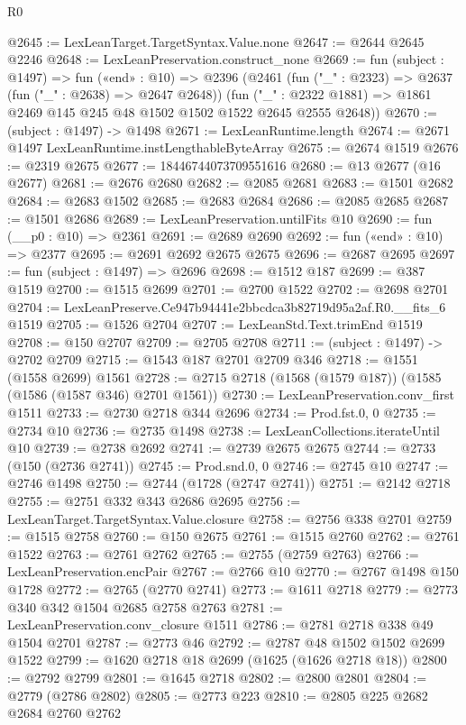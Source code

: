 \begin{lexlean}{R0}
\begin{coremodule}
@2645 := LexLeanTarget.TargetSyntax.Value.none
@2647 := @2644 @2645 @2246
@2648 := LexLeanPreservation.construct_none
@2669 := fun (subject : @1497) =>
  fun («end» : @10) =>
  @2396
    (@2461
      (fun ("_" : @2323) => @2637 (fun ("_" : @2638) => @2647 @2648))
      (fun ("_" : @2322 @1881) => @1861 @2469 @145 @245 @48 @1502 @1502 @1522 @2645 @2555 @2648))
@2670 := (subject : @1497) -> @1498
@2671 := LexLeanRuntime.length
@2674 := @2671 @1497 LexLeanRuntime.instLengthableByteArray
@2675 := @2674 @1519
@2676 := @2319 @2675
@2677 := 18446744073709551616
@2680 := @13 @2677 (@16 @2677)
@2681 := @2676 @2680
@2682 := @2085 @2681
@2683 := @1501 @2682
@2684 := @2683 @1502
@2685 := @2683 @2684
@2686 := @2085 @2685
@2687 := @1501 @2686
@2689 := LexLeanPreservation.untilFits @10
@2690 := fun (__p0 : @10) => @2361
@2691 := @2689 @2690
@2692 := fun («end» : @10) => @2377
@2695 := @2691 @2692 @2675 @2675
@2696 := @2687 @2695
@2697 := fun (subject : @1497) => @2696
@2698 := @1512 @187
@2699 := @387 @1519
@2700 := @1515 @2699
@2701 := @2700 @1522
@2702 := @2698 @2701
@2704 := LexLeanPreserve.Ce947b94441e2bbcdca3b82719d95a2af.R0.__fits_6 @1519
@2705 := @1526 @2704
@2707 := LexLeanStd.Text.trimEnd @1519
@2708 := @150 @2707
@2709 := @2705 @2708
@2711 := (subject : @1497) -> @2702 @2709
@2715 := @1543 @187 @2701 @2709 @346
@2718 := @1551 (@1558 @2699) @1561
@2728 := @2715 @2718 (@1568 (@1579 @187)) (@1585 (@1586 (@1587 @346) @2701 @1561))
@2730 := LexLeanPreservation.conv_first @1511
@2733 := @2730 @2718 @344 @2696
@2734 := Prod.fst.{0, 0}
@2735 := @2734 @10
@2736 := @2735 @1498
@2738 := LexLeanCollections.iterateUntil @10
@2739 := @2738 @2692
@2741 := @2739 @2675 @2675
@2744 := @2733 (@150 (@2736 @2741))
@2745 := Prod.snd.{0, 0}
@2746 := @2745 @10
@2747 := @2746 @1498
@2750 := @2744 (@1728 (@2747 @2741))
@2751 := @2142 @2718
@2755 := @2751 @332 @343 @2686 @2695
@2756 := LexLeanTarget.TargetSyntax.Value.closure
@2758 := @2756 @338 @2701
@2759 := @1515 @2758
@2760 := @150 @2675
@2761 := @1515 @2760
@2762 := @2761 @1522
@2763 := @2761 @2762
@2765 := @2755 (@2759 @2763)
@2766 := LexLeanPreservation.encPair
@2767 := @2766 @10
@2770 := @2767 @1498 @150 @1728
@2772 := @2765 (@2770 @2741)
@2773 := @1611 @2718
@2779 := @2773 @340 @342 @1504 @2685 @2758 @2763
@2781 := LexLeanPreservation.conv_closure @1511
@2786 := @2781 @2718 @338 @49 @1504 @2701
@2787 := @2773 @46
@2792 := @2787 @48 @1502 @1502 @2699 @1522
@2799 := @1620 @2718 @18 @2699 (@1625 (@1626 @2718 @18))
@2800 := @2792 @2799
@2801 := @1645 @2718
@2802 := @2800 @2801
@2804 := @2779 (@2786 @2802)
@2805 := @2773 @223
@2810 := @2805 @225 @2682 @2684 @2760 @2762

\end{coremodule}
\end{lexlean}
